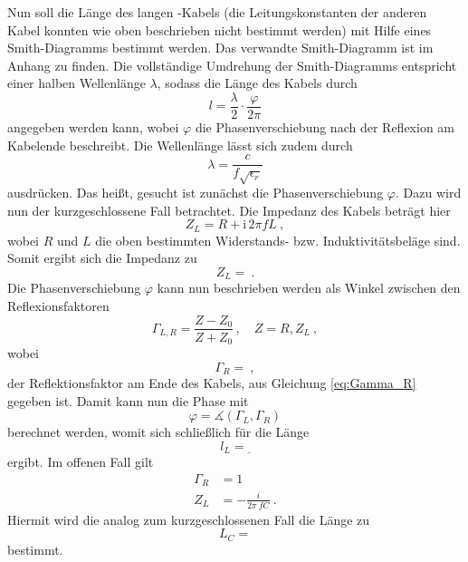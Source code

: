 Nun soll die Länge des langen \BU-Kabels (die Leitungskonstanten der anderen
Kabel konnten wie oben beschrieben nicht bestimmt werden) mit Hilfe eines
Smith-Diagramms bestimmt werden. Das verwandte Smith-Diagramm ist
im Anhang zu finden. Die vollständige Umdrehung der
Smith-Diagramms entspricht einer halben Wellenlänge $\lambda$, sodass die Länge
des Kabels durch
\begin{equation}
  l = \frac{\lambda}{2} \cdot \frac{\varphi}{2 \pi}
\end{equation}
angegeben werden kann, wobei $\varphi$ die Phasenverschiebung nach der Reflexion
am Kabelende beschreibt. Die Wellenlänge lässt sich zudem durch
\begin{equation}
  \lambda = \frac{c}{f \sqrt{\epsilon_r}}
\end{equation}
ausdrücken.
Das heißt, gesucht ist zunächst die Phasenverschiebung $\varphi$.
Dazu wird nun der kurzgeschlossene Fall betrachtet.
Die Impedanz des Kabels beträgt hier
\begin{equation}
  Z_L = R + \text{i}\, 2 \pi f L~,
\end{equation}
wobei $R$ und $L$ die oben bestimmten Widerstands- bzw. Induktivitätsbeläge
sind. Somit ergibt sich die Impedanz zu
\begin{equation}
  Z_L = ~.
\end{equation}
Die Phasenverschiebung $\varphi$ kann nun beschrieben werden als Winkel
zwischen den Reflexionsfaktoren
\begin{equation}
  \Gamma_{L,R} = \frac{Z - Z_0}{Z + Z_0}\,, \quad Z = R, Z_L~,
\end{equation}
wobei
\begin{equation}
  \Gamma_R = ~,
\end{equation}
der Reflektionsfaktor am Ende des Kabels,
aus Gleichung \eqref{eq:Gamma_R} gegeben ist.
Damit kann nun die Phase mit
\begin{equation}
  \varphi = \measuredangle(\Gamma_L, \Gamma_R)
\end{equation}
berechnet werden, womit sich schließlich für die Länge
\begin{equation}
  l_L = \underline{}
\end{equation}
ergibt.
Im offenen Fall gilt
\begin{align}
  \Gamma_R &= 1 \\
  Z_L &= - \frac{i}{2\pi\ fC}~.
\end{align}
Hiermit wird die analog zum kurzgeschlossenen Fall die Länge zu
\begin{equation}
  L_C = 
\end{equation}
bestimmt.

